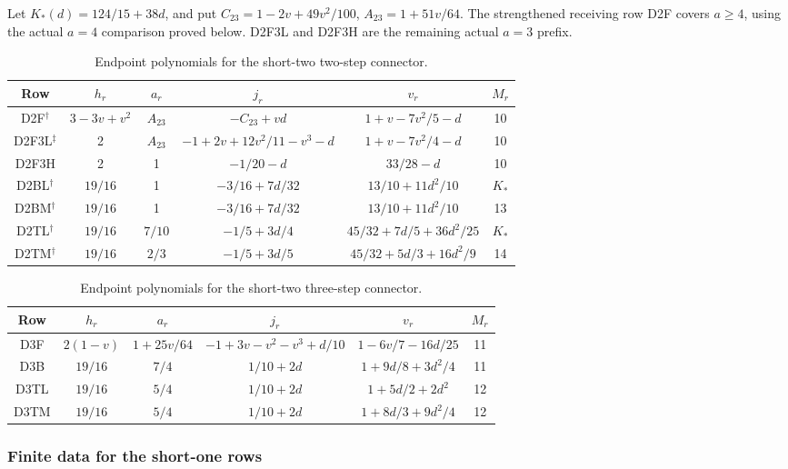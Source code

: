 Let \(K_*(d)=124/15+38d\), and put
\(C_{23}=1-2v+49v^2/100\), \(A_{23}=1+51v/64\).
The strengthened receiving row D2F covers \(a\ge4\), using the
actual \(a=4\) comparison proved below. D2F3L and D2F3H are the
remaining actual \(a=3\) prefix.
\begin{table}[htbp]\centering\small
\caption{Endpoint polynomials for the short-two two-step connector.}
\label{tab:q117-unified:short2-two-data}
\begin{tabular}{@{}cccccc@{}}
\toprule
Row&\(h_r\)&\(a_r\)&\(j_r\)&\(v_r\)&\(M_r\)\\
\midrule
D2F\(^{\dagger}\)&\(3-3v+v^2\)&\(A_{23}\)&\(-C_{23}+vd\)
 &\(1+v-7v^2/5-d\)&10\\
D2F3L\(^{\ddagger}\)&2&\(A_{23}\)&\(-1+2v+12v^2/11-v^3-d\)
 &\(1+v-7v^2/4-d\)&10\\
D2F3H&2&1&\(-1/20-d\)&\(33/28-d\)&10\\
D2BL\(^{\dagger}\)&\(19/16\)&1&\(-3/16+7d/32\)
 &\(13/10+11d^2/10\)&\(K_*\)\\
D2BM\(^{\dagger}\)&\(19/16\)&1&\(-3/16+7d/32\)
 &\(13/10+11d^2/10\)&13\\
D2TL\(^{\dagger}\)&\(19/16\)&\(7/10\)&\(-1/5+3d/4\)
 &\(45/32+7d/5+36d^2/25\)&\(K_*\)\\
D2TM\(^{\dagger}\)&\(19/16\)&\(2/3\)&\(-1/5+3d/5\)
 &\(45/32+5d/3+16d^2/9\)&14\\
\bottomrule
\end{tabular}
\end{table}

\begin{table}[htbp]\centering\small
\caption{Endpoint polynomials for the short-two three-step connector.}
\label{tab:q117-unified:short2-three-data}
\begin{tabular}{@{}cccccc@{}}
\toprule
Row&\(h_r\)&\(a_r\)&\(j_r\)&\(v_r\)&\(M_r\)\\
\midrule
D3F&\(2(1-v)\)&\(1+25v/64\)&\(-1+3v-v^2-v^3+d/10\)
 &\(1-6v/7-16d/25\)&11\\
D3B&\(19/16\)&\(7/4\)&\(1/10+2d\)
 &\(1+9d/8+3d^2/4\)&11\\
D3TL&\(19/16\)&\(5/4\)&\(1/10+2d\)
 &\(1+5d/2+2d^2\)&12\\
D3TM&\(19/16\)&\(5/4\)&\(1/10+2d\)
 &\(1+8d/3+9d^2/4\)&12\\
\bottomrule
\end{tabular}
\end{table}

\subsubsection{Finite data for the short-one rows}
\label{sec:q117-unified:short-one-data}

